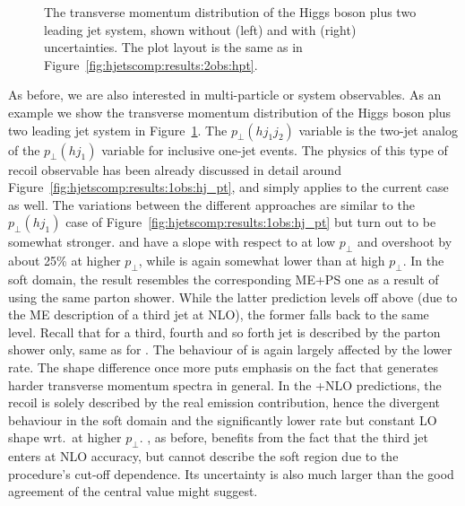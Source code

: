 \begin{figure}[t!]
  \caption{\label{fig:hjetscomp:results:2obs:hjj_pt}%
    The transverse momentum distribution of the Higgs boson plus two
    leading jet system, shown without (left) and with (right)
    uncertainties. The plot layout is the same as in
    Figure~\ref{fig:hjetscomp:results:2obs:hpt}.}
\end{figure}

As before, we are also interested in multi-particle or system
observables. As an example we show the transverse momentum
distribution of the Higgs boson plus two leading jet system in
Figure~\ref{fig:hjetscomp:results:2obs:hjj_pt}. The $p_\perp(hj_1j_2)$
variable is the two-jet analog of the $p_\perp(hj_1)$ variable for
inclusive one-jet events. The physics of this type of recoil
observable has been already discussed in detail around
Figure~\ref{fig:hjetscomp:results:1obs:hj_pt}, and simply applies to
the current case as well. The variations between the different
approaches are similar to the $p_\perp(hj_1)$ case of
Figure~\ref{fig:hjetscomp:results:1obs:hj_pt} but turn out
to be somewhat stronger. \MGaMC and \Sherpa have a slope with respect
to \Powheg at low $p_\perp$ and overshoot by about 25\% at higher
$p_\perp$, while \Herwig is again somewhat lower than \Powheg at high
$p_\perp$. In the soft domain, the \Sherpa \NNLOPS result resembles
the corresponding ME+PS one as a result of using the same parton
shower. While the latter prediction levels off above \Powheg (due to
the ME description of a third jet at NLO), the former falls back to
the same level. Recall that for \Sherpa \NNLOPS a third, fourth and so
forth jet is described by the parton shower only, same as for \Powheg. The behaviour of
\Hej is again largely affected by the lower rate. The shape difference
once more puts emphasis on the fact that \Hej generates harder
transverse momentum spectra in general. In the \GoSam{}+\Sherpa NLO
predictions, the recoil is solely described by the real emission
contribution, hence the divergent behaviour in the soft domain and the
significantly lower rate but constant LO shape wrt.~\Powheg at higher
$p_\perp$. \Loopsim, as before, benefits from the fact that the third
jet enters at NLO accuracy, but cannot describe the soft region due to
the procedure's cut-off dependence. Its uncertainty is also much larger 
than the good agreement of the central value might suggest.

